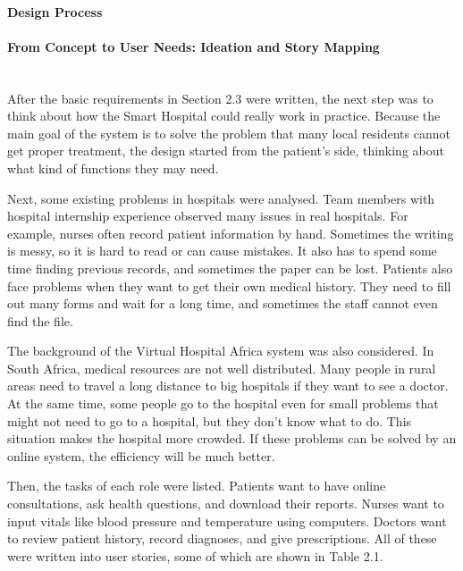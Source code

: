 %
%

\paragraph{Design Process}\mbox{}
\paragraph{From Concept to User Needs: Ideation and Story Mapping}\mbox{}\\
After the basic requirements in Section 2.3 were written, the next step was to think about how the Smart Hospital could really work in practice. Because the main goal of the system is to solve the problem that many local residents cannot get proper treatment, the design started from the patient’s side, thinking about what kind of functions they may need.

Next, some existing problems in hospitals were analysed. Team members with hospital internship experience observed many issues in real hospitals. For example, nurses often record patient information by hand. Sometimes the writing is messy, so it is hard to read or can cause mistakes. It also has to spend some time finding previous records, and sometimes the paper can be lost. Patients also face problems when they want to get their own medical history. They need to fill out many forms and wait for a long time, and sometimes the staff cannot even find the file.

The background of the Virtual Hospital Africa system was also considered. In South Africa, medical resources are not well distributed. Many people in rural areas need to travel a long distance to big hospitals if they want to see a doctor. At the same time, some people go to the hospital even for small problems that might not need to go to a hospital, but they don’t know what to do. This situation makes the hospital more crowded. If these problems can be solved by an online system, the efficiency will be much better.

Then, the tasks of each role were listed. Patients want to have online consultations, ask health questions, and download their reports. Nurses want to input vitals like blood pressure and temperature using computers. Doctors want to review patient history, record diagnoses, and give prescriptions. All of these were written into user stories, some of which are shown in Table 2.1.

